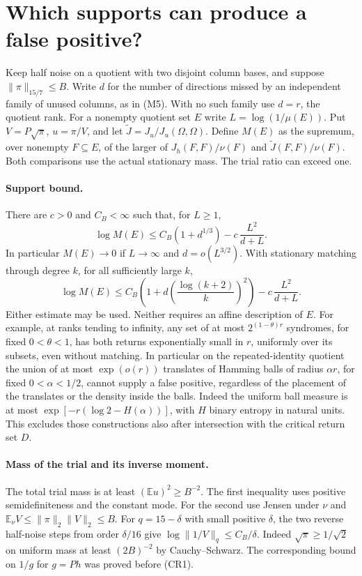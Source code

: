 \section{Which supports can produce a false positive?}
\label{sec:support-size}
Keep half noise on a quotient with two disjoint column bases, and suppose
$\|\pi\|_{15/7}\le B$. Write $d$ for the number of directions missed by an
independent family of unused columns, as in (M5). With no such family use
$d=r$, the quotient rank. For a nonempty quotient set $E$ write
$L=\log(1/\mu(E))$. Put $V=P\sqrt\pi$, $u=\pi/V$, and let
$\widetilde J=J_u/J_u(\Omega,\Omega)$. Define $M(E)$ as the supremum, over
nonempty $F\subseteq E$, of the larger of
$J_h(F,F)/\nu(F)$ and $\widetilde J(F,F)/\nu(F)$.
Both comparisons use the actual stationary mass. The trial ratio can exceed one.

\paragraph{Support bound.}
There are $c>0$ and $C_B<\infty$ such that, for $L\ge1$,
\[
 \log M(E)\le C_B(1+d^{1/3})-c\,\frac{L^2}{d+L}.             \tag{SS1}
\]
In particular $M(E)\to0$ if $L\to\infty$ and $d=o(L^{3/2})$.
With stationary matching through degree $k$, for all sufficiently large $k$,
\[
 \log M(E)\le C_B\left(1+d\left(\frac{\log(k+2)}k\right)^2\right)
                              -c\,\frac{L^2}{d+L}.             \tag{SS2}
\]
Either estimate may be used. Neither requires an affine description of $E$.
For example, at ranks tending to infinity, any set of at most
$2^{(1-\theta)r}$ syndromes, for fixed $0<\theta<1$, has both returns
exponentially small in $r$, uniformly over its subsets, even without matching.
In particular on the repeated-identity quotient the union of at most
$\exp(o(r))$ translates of Hamming balls of radius $\alpha r$, for fixed
$0<\alpha<1/2$, cannot supply a false positive, regardless of the placement
of the translates or the density inside the balls. Indeed the uniform ball
measure is at most $\exp[-r(\log 2-H(\alpha))]$, with $H$ binary entropy
in natural units. This excludes those constructions also after intersection
with the critical return set $D$.

\paragraph{Mass of the trial and its inverse moment.}
The total trial mass is at least $(\mathbb E u)^2\ge B^{-2}$.
The first inequality uses positive semidefiniteness and the constant mode.
For the second use Jensen under $\nu$ and
$\mathbb E_\nu V\le\|\pi\|_2\|V\|_2\le B$.
For $q=15-\delta$ with small positive $\delta$, the two reverse half-noise
steps from order $\delta/16$ give
$\log\|1/V\|_q\le C_B/\delta$. Indeed $\sqrt\pi\ge1/\sqrt2$ on
uniform mass at least $(2B)^{-2}$ by Cauchy--Schwarz. The corresponding
bound on $1/g$ for $g=Ph$ was proved before (CR1).

